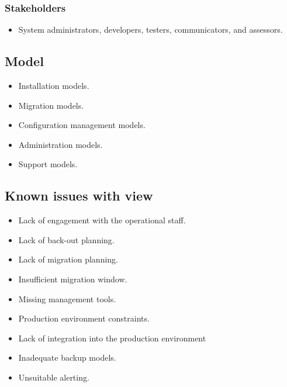 \subsubsection{Stakeholders}

\begin{itemize}
\item System administrators, developers, testers, communicators, and assessors.
\end{itemize}

\subsection{Model}

\begin{itemize}
\item Installation models.
\item Migration models.
\item Configuration management models. 
\item Administration models.
\item Support models.
\end{itemize}

\subsection{Known issues with view}

\begin{itemize}
\item Lack of engagement with the operational staff.
\item Lack of back-out planning.
\item Lack of migration planning.
\item Insufficient migration window.
\item Missing management tools.
\item Production environment constraints.
\item Lack of integration into the production environment 
\item Inadequate backup models.
\item Unsuitable alerting.
\end{itemize}

\FloatBarrier

